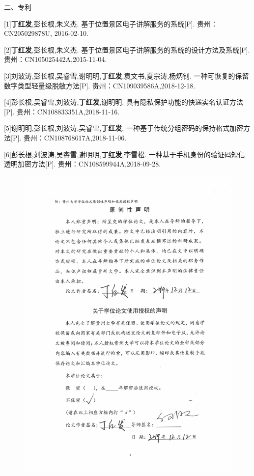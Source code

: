 \documentclass[pdftex,notypeinfo,twoside,openany,UTF8,fntef]{CASthesis}
\theoremstyle{THrm}{
	\newtheorem{question}{Question}[section]
	\newtheorem{property}{性质}[section]
	\newtheorem{assumption}{假设}[section]
	\newtheorem{claim}[lemma]{断言}
	
}
\begin{document}
\begin{resumelist}{二、专利}

[1]\textbf{丁红发},彭长根,朱义杰. 基于位置景区电子讲解服务的系统[P]. 贵州：CN205029878U, 2016-02-10.

[2]\textbf{丁红发},彭长根,朱义杰. 基于位置景区电子讲解服务的系统的设计方法及系统[P]. 贵州：CN105025442A,2015-11-04.

[3]刘波涛,彭长根,吴睿雪,谢明明,\textbf{丁红发},袁文书,夏宗涛,杨炳钊. 一种可恢复的保留数字类型轻量级脱敏方法[P]. 贵州：CN109039586A,2018-12-18.

[4]彭长根,吴睿雪,刘波涛,\textbf{丁红发},谢明明. 具有隐私保护功能的快递实名认证方法[P]. 贵州：CN108833351A,2018-11-16.

[5]谢明明,彭长根,刘波涛,吴睿雪,\textbf{丁红发}. 一种基于传统分组密码的保持格式加密方法[P]. 贵州：CN108768617A,2018-11-06.

[6]彭长根,刘波涛,吴睿雪,谢明明,\textbf{丁红发},李雪松. 一种基于手机身份的验证码短信透明加密方法[P]. 贵州：CN108599944A,2018-09-28.


\end{resumelist}


 \pagestyle{empty}
\begin{center}
\begin{figure}
  \centering
  \includegraphics[width=\textwidth]{shengming2.pdf}
\end{figure}
\end{center}
\end{document}

